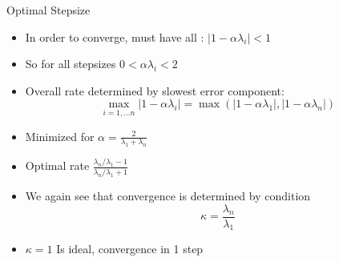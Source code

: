 \documentclass[11pt,compress,t,notes=noshow, xcolor=table]{beamer}
\begin{document}
\begin{vbframe}{Optimal Stepsize}

\begin{itemize}


\item In order to converge, must have all : $ | 1 - \alpha \lambda_i| < 1$ 

\item So for all stepsizes $0  < \alpha \lambda_i < 2 $

\item Overall rate determined by slowest error component: 
$$ \max \limits_{i = 1, \ldots n} | 1 - \alpha \lambda_i| =  \max (| 1 - \alpha \lambda_1|, | 1 - \alpha \lambda_n| )$$

\item Minimized for $ \alpha = \frac{2} {\lambda_1 + \lambda_n}$

\item Optimal rate 
$\frac{\lambda_n / \lambda_1 - 1}{\lambda_n / \lambda_1 + 1}  $

\item We again see that convergence is determined by condition $$\kappa = \frac{\lambda_n}{\lambda_1}$$

\item $\kappa=1$ Is ideal, convergence in 1 step

\end{itemize}
\end{vbframe}


\endlecture
\end{document}
